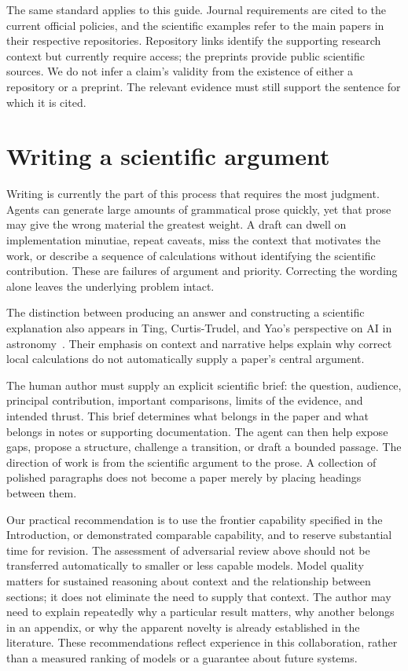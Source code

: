 \documentclass[aps,prd,reprint,nofootinbib]{revtex4-2}
\begin{document}
The same standard applies to this guide. Journal requirements are cited to the current official policies, and the scientific examples refer to the main papers in their respective repositories. Repository links identify the supporting research context but currently require access; the preprints provide public scientific sources. We do not infer a claim's validity from the existence of either a repository or a preprint. The relevant evidence must still support the sentence for which it is cited.

\section{Writing a scientific argument}\label{sec:writing}
Writing is currently the part of this process that requires the most judgment. Agents can generate large amounts of grammatical prose quickly, yet that prose may give the wrong material the greatest weight. A draft can dwell on implementation minutiae, repeat caveats, miss the context that motivates the work, or describe a sequence of calculations without identifying the scientific contribution. These are failures of argument and priority. Correcting the wording alone leaves the underlying problem intact.

The distinction between producing an answer and constructing a scientific explanation also appears in Ting, Curtis-Trudel, and Yao's perspective on AI in astronomy~\cite{TingUnderstanding}. Their emphasis on context and narrative helps explain why correct local calculations do not automatically supply a paper's central argument.

The human author must supply an explicit scientific brief: the question, audience, principal contribution, important comparisons, limits of the evidence, and intended thrust. This brief determines what belongs in the paper and what belongs in notes or supporting documentation. The agent can then help expose gaps, propose a structure, challenge a transition, or draft a bounded passage. The direction of work is from the scientific argument to the prose. A collection of polished paragraphs does not become a paper merely by placing headings between them.

Our practical recommendation is to use the frontier capability specified in the Introduction, or demonstrated comparable capability, and to reserve substantial time for revision. The assessment of adversarial review above should not be transferred automatically to smaller or less capable models. Model quality matters for sustained reasoning about context and the relationship between sections; it does not eliminate the need to supply that context. The author may need to explain repeatedly why a particular result matters, why another belongs in an appendix, or why the apparent novelty is already established in the literature. These recommendations reflect experience in this collaboration, rather than a measured ranking of models or a guarantee about future systems.
\end{document}
